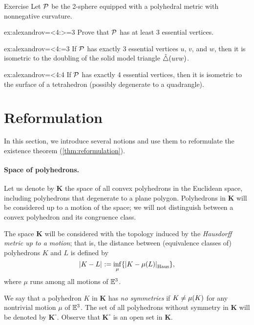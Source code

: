 \begin{thm}{Exercise}\label{ex:alexandrov=<4}
Let $\mathcal{P}$ be the 2-sphere equipped with a polyhedral metric with nonnegative curvature.

\begin{subthm}{ex:alexandrov=<4:>=3}
Prove that $\mathcal{P}$ has at least 3 essential vertices.
\end{subthm}

\begin{subthm}{ex:alexandrov=<4:=3}
If $\mathcal{P}$ has exactly 3 essential vertices $u$, $v$, and $w$, then it is isometric to the doubling of the solid model triangle $\tilde\triangle(uvw)$.
\end{subthm}

\begin{subthm}{ex:alexandrov=<4:4}
If $\mathcal{P}$ has exactly 4 essential vertices, then it is isometric to the surface of a tetrahedron (possibly degenerate to a quadrangle).
\end{subthm}

\end{thm}

\section{Reformulation}

In this section, we introduce several notions and use them to reformulate the existence theorem (\ref{thm:reformulation}).

\paragraph{Space of polyhedrons.}
Let us denote by $\bm{K}$ the space of all convex polyhedrons in the Euclidean space,
including polyhedrons that degenerate to a plane polygon.
Polyhedrons in $\bm{K}$ will be considered up to a motion of the space; we will not distinguish between a convex polyhedron and its congruence class.

The space $\bm{K}$ will be considered with the topology induced by the {}\emph{Hausdorff metric up to a motion};
that is, the distance between (equivalence classes of) polyhedrons $K$ and $L$ is defined by
\[|{K}-{L}|_{}^{{}}\mathrel{:=} \inf_\mu \{|{K}-{\mu(L)}|_{\operatorname{\rm Haus}\nolimits}^{{}}\},\]
where $\mu$ runs among all motions of $\mathbb{E}^3$.

We say that a polyhedron $K$ in $\bm{K}$ has \emph{no symmetries} if  $K\ne \mu(K)$ for any nontrivial motion $\mu$ of $\mathbb{E}^3$.
The set of all polyhedrons without symmetry in $\bm{K}$ will be denoted by $\bm{K}^\circ$.
Observe that $\bm{K}^\circ$ is an open set in $\bm{K}$.

